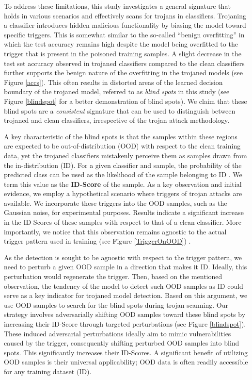 To address these limitations, this study investigates a general signature that holds in various scenarios and effectively scans for trojans in classifiers. Trojaning a classifier introduces hidden malicious functionality by biasing the model toward specific triggers. This is somewhat similar to the so-called ``benign overfitting'' \cite{tsigler2020benign,odyssey,MMBD} in which the test accuracy remains high despite the model being overfitted to the trigger that is present in the poisoned training samples. A slight decrease in the test set accuracy observed in trojaned classifiers compared to the clean classifiers further supports the benign nature of the overfitting in the trojaned models (see Figure \ref{accs}). This often results in distorted areas of the learned decision boundary of the trojaned model, referred to as {\it blind spots} in this study (see Figure \ref{blindspot} for a better demonstration of blind spots). We claim that these blind spots are a {\it consistent} signature that can be used to distinguish between trojaned and clean classifiers, irrespective of the trojan attack methodology.

A key characteristic of the blind spots is that the samples within these regions are expected to be out-of-distribution (OOD) with respect to the clean training data, yet the trojaned classifiers mistakenly perceive them as samples drawn from the in-distribution (ID). For a given classifier and sample, the probability of the predicted class can be used as the likelihood of the sample belonging to ID \cite{msp}. We term this value as the \textbf{ID-Score} of the sample. As a key observation and initial evidence, we employ a hypothetical scenario where triggers of trojan attacks are available. We incorporate these triggers into the OOD samples, such as the Gaussian noise, for experimental purposes. Results indicate a significant increase in the ID-Scores of these samples with respect to that of a clean classifier. More importantly, we notice that this observation remains agnostic to the actual trigger pattern used in training (see Figure \ref{TriggerOnOOD}) \cite{liang2017enhancing,kong2021opengan,fort2021exploring,hendrycks2016baseline,ruff2021unifying,salehi2021unified}.

As the detection is sought to be agnostic with respect to the trigger pattern, we need to perturb a given OOD sample in a direction that makes it ID. Ideally, this perturbation would regenerate the trigger. Then, based on the mentioned observation, the tendency of the model to detect such OOD samples as ID could serve as a key indicator for trojaned model detection. Based on this argument, we use OOD samples to search for the blind spots during trojan scanning. Our strategy involves adversarially shifting OOD samples toward these blind spots by increasing their ID-Score through targeted perturbations (see Figure \ref{blindspot}). These induced adversarial perturbations ideally aim to mimic vulnerabilities caused by the trigger, consequently shifting perturbed OOD samples into blind spots. This significantly increases their ID-Scores. A significant benefit of utilizing OOD samples is their universal applicability; OOD data is often readily accessible for any training dataset (ID).

